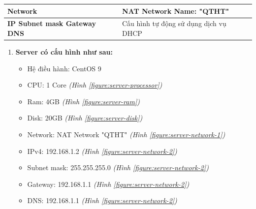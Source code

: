 \documentclass[a4paper, 11pt]{article}
\begin{document}
\begin{itemize}
\begin{minipage}{\linewidth}
\begin{multicols}{2}
\begin{minipage}{\linewidth}
\begin{tabular}{| p{.3\linewidth} | p{.4\linewidth} |}
                          \textbf{Network}                                               & NAT Network \newline Name: "QTHT"                                    \\
                          \hline

                          \textbf{IP \newline Subnet mask \newline Gateway \newline DNS} & Cấu hình tự động sử dụng dịch vụ DHCP                                \\
                          \hline
                      \end{tabular}
                  \end{minipage}
              \end{multicols}
          \end{minipage}
          \begin{enumerate}
              \item \textbf{Server có cấu hình như sau:}
                    \begin{itemize}
                        \item Hệ điều hành: CentOS 9
                        \item CPU: 1 Core \textit{(Hình \ref{figure:server-processor})}
                        \item Ram: 4GB \textit{(Hình \ref{figure:server-ram})}
                        \item Disk: 20GB \textit{(Hình \ref{figure:server-disk})}
                        \item Network: NAT Network "QTHT" \textit{(Hình \ref{figure:server-network-1})}
                        \item IPv4: 192.168.1.2 \textit{(Hình \ref{figure:server-network-2})}
                        \item Subnet mask: 255.255.255.0 \textit{(Hình \ref{figure:server-network-2})}
                        \item Gateway: 192.168.1.1 \textit{(Hình \ref{figure:server-network-2})}
                        \item DNS: 192.168.1.1 \textit{(Hình \ref{figure:server-network-2})}
                    \end{itemize}


\end{enumerate}
\end{itemize}
\end{document}
